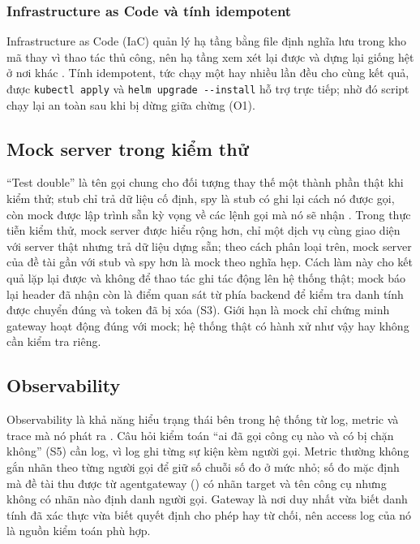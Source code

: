 \subsubsection{Infrastructure as Code và tính idempotent}

Infrastructure as Code (IaC) quản lý hạ tầng bằng file định nghĩa lưu trong kho mã thay vì thao tác thủ công, nên hạ tầng xem xét lại được và dựng lại giống hệt ở nơi khác \parencite{morris2020iac}. Tính idempotent, tức chạy một hay nhiều lần đều cho cùng kết quả, được \texttt{kubectl apply} và \texttt{helm upgrade -{}-install} hỗ trợ trực tiếp; nhờ đó script chạy lại an toàn sau khi bị dừng giữa chừng (O1).

\subsection{Mock server trong kiểm thử}\label{sec:ch3-mock}

``Test double'' là tên gọi chung cho đối tượng thay thế một thành phần thật khi kiểm thử; stub chỉ trả dữ liệu cố định, spy là stub có ghi lại cách nó được gọi, còn mock được lập trình sẵn kỳ vọng về các lệnh gọi mà nó sẽ nhận \parencite{fowler_mocks}. Trong thực tiễn kiểm thử, mock server được hiểu rộng hơn, chỉ một dịch vụ cùng giao diện với server thật nhưng trả dữ liệu dựng sẵn; theo cách phân loại trên, mock server của đề tài gần với stub và spy hơn là mock theo nghĩa hẹp. Cách làm này cho kết quả lặp lại được và không để thao tác ghi tác động lên hệ thống thật; mock báo lại header đã nhận còn là điểm quan sát từ phía backend để kiểm tra danh tính được chuyển đúng và token đã bị xóa (S3). Giới hạn là mock chỉ chứng minh gateway hoạt động đúng với mock; hệ thống thật có hành xử như vậy hay không cần kiểm tra riêng.

\subsection{Observability}\label{sec:ch3-obs}

Observability là khả năng hiểu trạng thái bên trong hệ thống từ log, metric và trace mà nó phát ra \parencite{majors2022observability}. Câu hỏi kiểm toán ``ai đã gọi công cụ nào và có bị chặn không'' (S5) cần log, vì log ghi từng sự kiện kèm người gọi. Metric thường không gắn nhãn theo từng người gọi để giữ số chuỗi số đo ở mức nhỏ; số đo mặc định mà đề tài thu được từ agentgateway () có nhãn target và tên công cụ nhưng không có nhãn nào định danh người gọi. Gateway là nơi duy nhất vừa biết danh tính đã xác thực vừa biết quyết định cho phép hay từ chối, nên access log của nó là nguồn kiểm toán phù hợp.

